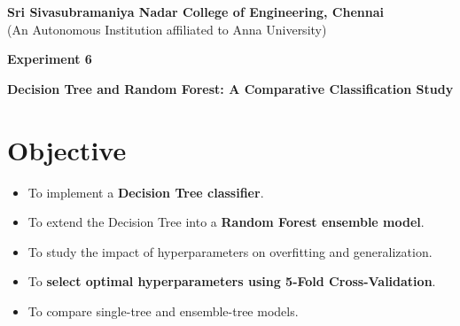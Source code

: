 \documentclass[11pt]{article}
\begin{document}
\begin{center}
    \Large \textbf{Sri Sivasubramaniya Nadar College of Engineering, Chennai} \\
    \large (An Autonomous Institution affiliated to Anna University) \\
    \vspace{0.3cm}
\end{center}

\begin{table}[h!]
\renewcommand{\arraystretch}{1.5}
\centering
{}
\end{table}

\begin{center}
    \textbf{\Large Experiment 6}
\end{center}

\begin{center}
    \textbf{Decision Tree and Random Forest: A Comparative Classification Study}
\end{center}

\section*{Objective}
\begin{itemize}
    \item To implement a \textbf{Decision Tree classifier}.
    \item To extend the Decision Tree into a \textbf{Random Forest ensemble model}.
    \item To study the impact of hyperparameters on overfitting and generalization.
    \item To \textbf{select optimal hyperparameters using 5-Fold Cross-Validation}.
    \item To compare single-tree and ensemble-tree models.
\end{itemize}
\end{document}
